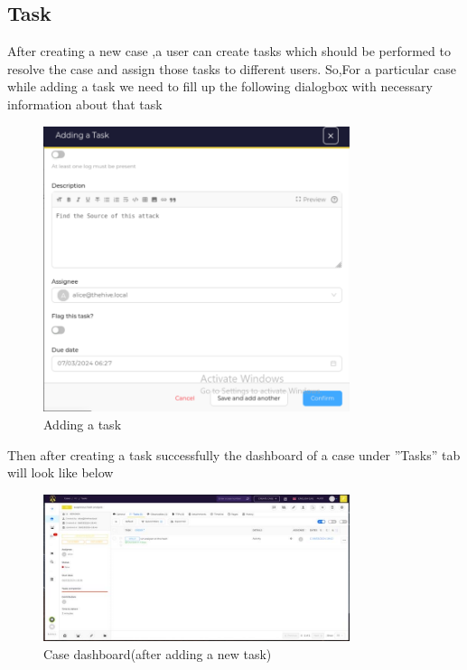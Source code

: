 \documentclass{article}
\begin{document}
\subsection{Task}
After creating a new case ,a user can create tasks which should be performed
to resolve the case and assign those tasks to different users. So,For a
particular case while adding a task we need to fill up the following dialogbox
with necessary information about that task
\begin{figure}[H]
    \centering
    \includegraphics[width=0.8\textwidth]{img12.png}
    \caption{Adding a task}
    \label{fig:entities}
\end{figure}
Then after creating a task successfully the dashboard of a case under
”Tasks” tab will look like below
\begin{figure}[H]
    \centering
    \includegraphics[width=0.8\textwidth]{img38.png}
    \caption{Case dashboard(after adding a new task)}
    \label{fig:entities}
\end{figure}
\end{document}
